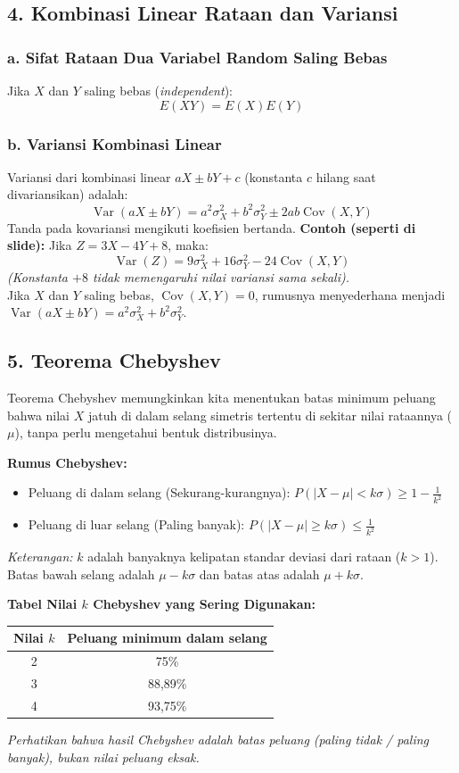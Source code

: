\documentclass[12pt, a4paper]{article}
\begin{document}
\subsection{4. Kombinasi Linear Rataan dan Variansi}
\subsubsection{a. Sifat Rataan Dua Variabel Random Saling Bebas}
Jika $X$ dan $Y$ saling bebas (\textit{independent}):
$$E(XY) = E(X)E(Y)$$

\subsubsection{b. Variansi Kombinasi Linear}
Variansi dari kombinasi linear $aX \pm bY + c$ (konstanta $c$ hilang saat divariansikan) adalah:
$$\operatorname{Var}(aX \pm bY) = a^2\sigma_X^2 + b^2\sigma_Y^2 \pm 2ab\operatorname{Cov}(X,Y)$$
Tanda pada kovariansi mengikuti koefisien bertanda.
\textbf{Contoh (seperti di slide):} Jika $Z = 3X - 4Y + 8$, maka:
$$\operatorname{Var}(Z) = 9\sigma_X^2 + 16\sigma_Y^2 - 24\operatorname{Cov}(X,Y)$$
\textit{(Konstanta $+8$ tidak memengaruhi nilai variansi sama sekali).} \\
Jika $X$ dan $Y$ saling bebas, $\operatorname{Cov}(X,Y) = 0$, rumusnya menyederhana menjadi $\operatorname{Var}(aX \pm bY) = a^2\sigma_X^2 + b^2\sigma_Y^2$.

\subsection{5. Teorema Chebyshev}
Teorema Chebyshev memungkinkan kita menentukan batas minimum peluang bahwa nilai $X$ jatuh di dalam selang simetris tertentu di sekitar nilai rataannya ($\mu$), tanpa perlu mengetahui bentuk distribusinya.

\textbf{Rumus Chebyshev:}
\begin{itemize}
    \item Peluang di dalam selang (Sekurang-kurangnya): $P(|X - \mu| < k\sigma) \ge 1 - \frac{1}{k^2}$
    \item Peluang di luar selang (Paling banyak): $P(|X - \mu| \ge k\sigma) \le \frac{1}{k^2}$
\end{itemize}
\textit{Keterangan:} $k$ adalah banyaknya kelipatan standar deviasi dari rataan ($k > 1$). Batas bawah selang adalah $\mu - k\sigma$ dan batas atas adalah $\mu + k\sigma$.

\textbf{Tabel Nilai $k$ Chebyshev yang Sering Digunakan:}
\begin{table}[h!]
\centering
\begin{tabular}{|c|c|}
\hline
\textbf{Nilai $k$} & \textbf{Peluang minimum dalam selang} \\ \hline
2 & 75\% \\ \hline
3 & 88,89\% \\ \hline
4 & 93,75\% \\ \hline
\end{tabular}
\end{table}
\textit{Perhatikan bahwa hasil Chebyshev adalah batas peluang (paling tidak / paling banyak), bukan nilai peluang eksak.}
\end{document}
